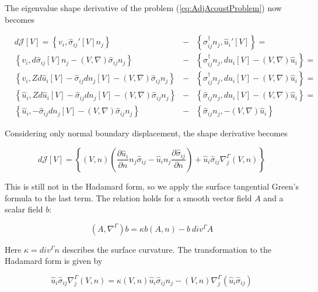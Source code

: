 The eigenvalue shape derivative of the problem (\ref{eq:AdjAcoustProblem}) now becomes

\begin{subequations}
\begin{align}
&d \mathcal{J} [V] = \left\{ v_i , \hat{\sigma}_{ij}'[V] n_j \right\} &-& \left\{\sigma_{ij}^\dagger  n_j,  \hat{u}_i'[V] \right\} = \\
&\left\{ v_i ,d\hat{\sigma}_{ij}[V] n_j - (V,\nabla) \hat{\sigma}_{ij} n_j \right\} &-& \left\{\sigma_{ij}^\dagger  n_j,  d\hat{u}_i [V] - (V,\nabla) \hat{u}_i \right\} = \\
&\left\{ v_i , Z d\hat{u}_i [V] - \hat{\sigma}_{ij} dn_j[V] - (V,\nabla) \hat{\sigma}_{ij} n_j \right\} &-& \left\{\sigma_{ij}^\dagger  n_j,  d\hat{u}_i [V] - (V,\nabla) \hat{u}_i \right\} = \\
&\left\{ \hat{u}_i , Z d\hat{u}_i [V] - \hat{\sigma}_{ij} dn_j[V] - (V,\nabla) \hat{\sigma}_{ij} n_j \right\} &-& \left\{\hat{\sigma}_{ij}  n_j,  d\hat{u}_i [V] - (V,\nabla) \hat{u}_i \right\} = \\
&\left\{ \hat{u}_i , - \hat{\sigma}_{ij} dn_j[V] - (V,\nabla) \hat{\sigma}_{ij} n_j \right\} &-& \left\{\hat{\sigma}_{ij}  n_j,  - (V,\nabla) \hat{u}_i \right\}
\end{align}
\end{subequations}

Considering only normal boundary displacement, the shape derivative becomes

\begin{equation}
\label{eq:ShapeDerAcoustNotHadam}
d \mathcal{J} [V] = \left\{ (V,n) \left(\frac{\partial \hat{u}_i}{\partial n} n_j \hat{\sigma}_{ij} -  \hat{u}_i n_j \frac{\partial \hat{\sigma}_{ij}}{\partial n}\right) + \hat{u}_i \hat{\sigma}_{ij} \nabla_j^{\Gamma} (V,n) \right\}
\end{equation}

This is still not in the Hadamard form, so we apply the surface tangential Green's formula \cite{Delfour} to the last term. The relation holds for a smooth vector field $A$ and a scalar field $b$:

\begin{equation}
(A , \nabla^{\Gamma}) b = \kappa b (A,n)   - b \ div^{\Gamma} A
\end{equation}

Here $\kappa = div^{\Gamma}n$ describes the surface curvature. The transformation to the Hadamard form is given by

\begin{equation}
\hat{u}_i \hat{\sigma}_{ij} \nabla_j^{\Gamma} (V,n) = \kappa (V,n) \hat{u}_i \hat{\sigma}_{ij} n_j - (V,n) \nabla_j^{\Gamma} (\hat{u}_i \hat{\sigma}_{ij})
\end{equation}


